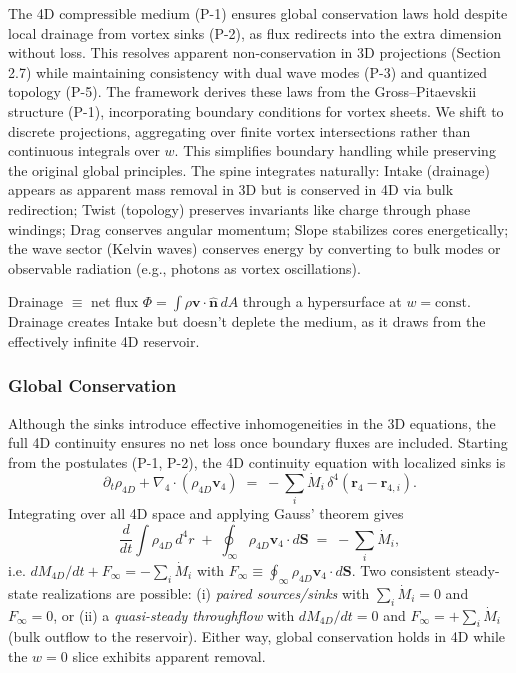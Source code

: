 The 4D compressible medium (P-1) ensures global conservation laws hold despite local drainage from vortex sinks (P-2), as flux redirects into the extra dimension without loss. This resolves apparent non-conservation in 3D projections (Section 2.7) while maintaining consistency with dual wave modes (P-3) and quantized topology (P-5). The framework derives these laws from the Gross–Pitaevskii structure (P-1), incorporating boundary conditions for vortex sheets. We shift to discrete projections, aggregating over finite vortex intersections rather than continuous integrals over $w$. This simplifies boundary handling while preserving the original global principles. The spine integrates naturally: Intake (drainage) appears as apparent mass removal in 3D but is conserved in 4D via bulk redirection; Twist (topology) preserves invariants like charge through phase windings; Drag conserves angular momentum; Slope stabilizes cores energetically; the wave sector (Kelvin waves) conserves energy by converting to bulk modes or observable radiation (e.g., photons as vortex oscillations).

Drainage $\equiv$ net flux $\Phi = \int \rho \mathbf{v} \cdot \hat{\mathbf{n}} \, dA$ through a hypersurface at $w = \text{const}$. Drainage creates Intake but doesn't deplete the medium, as it draws from the effectively infinite 4D reservoir.

\subsubsection{Global Conservation}
Although the sinks introduce effective inhomogeneities in the 3D equations, the full 4D continuity ensures no net loss once boundary fluxes are included. Starting from the postulates (P-1, P-2), the 4D continuity equation with localized sinks is
\begin{equation}
\partial_t \rho_{4D}+\nabla_4 \!\cdot (\rho_{4D}\mathbf{v}_4)\;=\;-\sum_i \dot{M}_i\,\delta^4(\mathbf{r}_4-\mathbf{r}_{4,i}).
\end{equation}
Integrating over all 4D space and applying Gauss' theorem gives
\begin{equation}
\frac{d}{dt}\!\int \rho_{4D}\,d^4 r\;+\;\oint_{\infty}\rho_{4D}\mathbf{v}_4\!\cdot d\mathbf{S}\;=\;-\sum_i \dot M_i,
\end{equation}
i.e. $dM_{4D}/dt+F_\infty=-\sum_i\dot M_i$ with $F_\infty\equiv\oint_{\infty}\rho_{4D}\mathbf{v}_4\!\cdot d\mathbf{S}$. Two consistent steady-state realizations are possible: (i) \emph{paired sources/sinks} with $\sum_i \dot M_i=0$ and $F_\infty=0$, or (ii) a \emph{quasi-steady throughflow} with $dM_{4D}/dt=0$ and $F_\infty=+\sum_i \dot M_i$ (bulk outflow to the reservoir). Either way, global conservation holds in 4D while the $w=0$ slice exhibits apparent removal.

